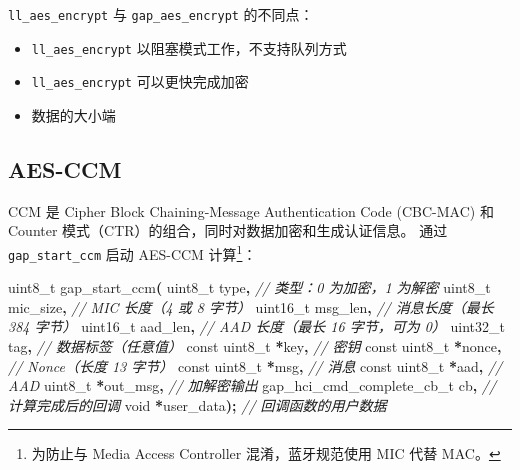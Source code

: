 \documentclass[
  12pt,
]{book}
\newenvironment{Shaded}{\begin{snugshade}}{\end{snugshade}}
\newcommand{\CommentTok}[1]{\textcolor[rgb]{0.56,0.35,0.01}{\textit{#1}}}
\newcommand{\DataTypeTok}[1]{\textcolor[rgb]{0.13,0.29,0.53}{#1}}
\newcommand{\NormalTok}[1]{#1}
\newcommand{\OperatorTok}[1]{\textcolor[rgb]{0.81,0.36,0.00}{\textbf{#1}}}
\providecommand{\tightlist}{%
  \setlength{\itemsep}{0pt}\setlength{\parskip}{0pt}}
\begin{document}
\texttt{ll\_aes\_encrypt} 与 \texttt{gap\_aes\_encrypt} 的不同点：

\begin{itemize}
\tightlist
\item
  \texttt{ll\_aes\_encrypt} 以阻塞模式工作，不支持队列方式
\item
  \texttt{ll\_aes\_encrypt} 可以更快完成加密
\item
  数据的大小端
\end{itemize}

\hypertarget{aes-ccm}{%
\subsection{AES-CCM}\label{aes-ccm}}

CCM 是 Cipher Block Chaining-Message Authentication Code (CBC-MAC) 和 Counter 模式（CTR）的组合，同时对数据加密和生成认证信息。
通过 \texttt{gap\_start\_ccm} 启动 AES-CCM 计算\footnote{为防止与 Media Access Controller 混淆，蓝牙规范使用 MIC 代替 MAC。}：

\begin{Shaded}
\begin{Highlighting}[]
\DataTypeTok{uint8\_t}\NormalTok{ gap\_start\_ccm}\OperatorTok{(}
        \DataTypeTok{uint8\_t}\NormalTok{  type}\OperatorTok{,}        \CommentTok{// 类型：0 为加密，1 为解密}
        \DataTypeTok{uint8\_t}\NormalTok{  mic\_size}\OperatorTok{,}    \CommentTok{// MIC 长度（4 或 8 字节）}
        \DataTypeTok{uint16\_t}\NormalTok{ msg\_len}\OperatorTok{,}     \CommentTok{// 消息长度（最长 384 字节）}
        \DataTypeTok{uint16\_t}\NormalTok{ aad\_len}\OperatorTok{,}     \CommentTok{// AAD 长度（最长 16 字节，可为 0）}
        \DataTypeTok{uint32\_t}\NormalTok{ tag}\OperatorTok{,}         \CommentTok{// 数据标签（任意值）}
        \DataTypeTok{const} \DataTypeTok{uint8\_t} \OperatorTok{*}\NormalTok{key}\OperatorTok{,}   \CommentTok{// 密钥}
        \DataTypeTok{const} \DataTypeTok{uint8\_t} \OperatorTok{*}\NormalTok{nonce}\OperatorTok{,} \CommentTok{// Nonce（长度 13 字节）}
        \DataTypeTok{const} \DataTypeTok{uint8\_t} \OperatorTok{*}\NormalTok{msg}\OperatorTok{,}   \CommentTok{// 消息}
        \DataTypeTok{const} \DataTypeTok{uint8\_t} \OperatorTok{*}\NormalTok{aad}\OperatorTok{,}   \CommentTok{// AAD}
        \DataTypeTok{uint8\_t} \OperatorTok{*}\NormalTok{out\_msg}\OperatorTok{,}     \CommentTok{// 加解密输出}
\NormalTok{        gap\_hci\_cmd\_complete\_cb\_t cb}\OperatorTok{,} \CommentTok{// 计算完成后的回调}
        \DataTypeTok{void} \OperatorTok{*}\NormalTok{user\_data}\OperatorTok{);}             \CommentTok{// 回调函数的用户数据}
\end{Highlighting}
\end{Shaded}
\end{document}
